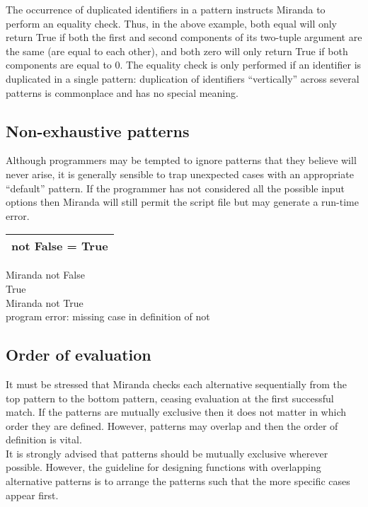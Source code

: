 \documentclass[11pt]{article}
\begin{document}
The occurrence of duplicated identifiers in a pattern instructs Miranda to perform
an equality check. Thus, in the above example, both equal will only return True
if both the first and second components of its two-tuple argument are the same
(are equal to each other), and both zero will only return True if both components
are equal to 0.
The equality check is only performed if an identifier is duplicated in a single
pattern: duplication of identifiers “vertically” across several patterns is commonplace and has no special meaning.

\subsection{Non-exhaustive patterns}
Although programmers may be tempted to ignore patterns that they believe will
never arise, it is generally sensible to trap unexpected cases with an appropriate
“default” pattern. If the programmer has not considered all the possible input
options then Miranda will still permit the script file but may generate a run-time
error.

\begin{center}
    \begin{tabular}{|c|}
    \hline
not False = True\\
\hline
    \end{tabular}
\end{center}

\begin{tcolorbox}
Miranda not False\\
True\\
Miranda not True\\
program error: missing case in definition of not
\end{tcolorbox}

\subsection{Order of evaluation}
It must be stressed that Miranda checks each alternative sequentially from the top
pattern to the bottom pattern, ceasing evaluation at the first successful match. If
the patterns are mutually exclusive then it does not matter in which order they are
defined. However, patterns may overlap and then the order of definition is vital.\\
It is strongly advised that patterns should be mutually exclusive wherever possible.
However, the guideline for designing functions with overlapping alternative
patterns is to arrange the patterns such that the more specific cases appear first.
\end{document}

